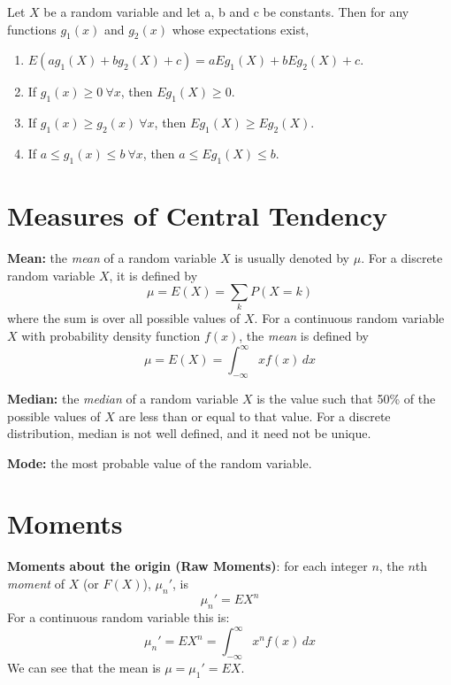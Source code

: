 \begin{theorem}
	Let $X$ be a random variable and let a, b and c be constants. Then for any functions $g_1(x)$ and $g_2(x)$ whose expectations exist,
	\begin{enumerate}[\bfseries a)]
		\item $E(ag_1(X) + bg_2(X) + c) = aEg_1(X) + bEg_2(X) + c$.
		\item If $g_1(x) \geq 0 \ \forall x$, then $Eg_1(X) \geq 0$.
		\item If $g_1(x) \geq g_2(x) \ \forall x$, then $Eg_1(X) \geq Eg_2(X)$.
		\item If $a \leq g_1(x) \leq b \ \forall x$, then $a \leq Eg_1(X) \leq b$. 
	\end{enumerate}
\end{theorem}

\section{Measures of Central Tendency}

\begin{definition}
	\textbf{Mean:} the \textit{mean} of a random variable $X$ is usually denoted by $\mu$. For a discrete random variable $X$, it is defined by
	\[
		\mu = E(X) = \sum_{k}P(X = k)
	\]
	where the sum is over all possible values of $X$. For a continuous random variable $X$ with probability density function $f(x)$, the \textit{mean} is defined by
	\[
		\mu = E(X) = \int_{-\infty}^{\infty} xf(x) \, dx
	\]
\end{definition}

\begin{definition}
	\textbf{Median:} the \textit{median} of a random variable $X$ is the value such that 50\% of the possible values of $X$ are less than or equal to that value. For a discrete distribution, median is not well defined, and it need not be unique.
\end{definition}

\begin{definition}
	\textbf{Mode:} the most probable value of the random variable.
\end{definition}

\section{Moments}

\begin{definition}
	\textbf{Moments about the origin (Raw Moments)}: for each integer $n$, the $n$th \textit{moment} of $X$ (or $F(X)$), $\mu_n'$, is
	\[
		\mu_n' = EX^n
	\]
	For a continuous random variable this is:
	\[
		\mu_n' = EX^n = \int_{-\infty}^{\infty} x^n f(x) \, dx
	\]
	We can see that the mean is $\mu = \mu_1' = EX$.
\end{definition}

